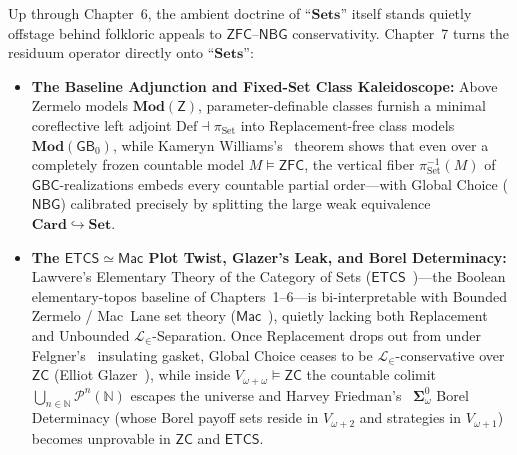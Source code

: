\documentclass[10pt,twoside,openright]{book}
\theoremstyle{crmplain}
\theoremstyle{crmdef}
\theoremstyle{crmremark}
\begin{document}
Up through Chapter~6, the ambient doctrine of ``$\mathbf{Sets}$'' itself stands quietly offstage behind folkloric appeals to $\mathsf{ZFC}$--$\mathsf{NBG}$ conservativity. Chapter~7 turns the residuum operator directly onto ``$\mathbf{Sets}$'':
\begin{itemize}
  \item \textbf{The Baseline Adjunction and Fixed-Set Class Kaleidoscope:} Above Zermelo models $\mathbf{Mod}(\mathsf{Z})$, parameter-definable classes furnish a minimal coreflective left adjoint $\mathrm{Def} \dashv \pi_{\mathrm{Set}}$ into Replacement-free class models $\mathbf{Mod}(\mathsf{GB}_0)$, while Kameryn Williams's~\cite{Williams18} theorem shows that even over a completely frozen countable model $M \models \mathsf{ZFC}$, the vertical fiber $\pi_{\mathrm{Set}}^{-1}(M)$ of $\mathsf{GBC}$-realizations embeds every countable partial order---with Global Choice ($\mathsf{NBG}$) calibrated precisely by splitting the large weak equivalence $\mathbf{Card} \hookrightarrow \mathbf{Set}$.
  \item \textbf{The $\mathsf{ETCS} \simeq \mathsf{Mac}$ Plot Twist, Glazer's Leak, and Borel Determinacy:} Lawvere's Elementary Theory of the Category of Sets ($\mathsf{ETCS}$~\cite{Lawvere64})---the Boolean elementary-topos baseline of Chapters~1--6---is bi-interpretable with Bounded Zermelo / Mac~Lane set theory ($\mathsf{Mac}$~\cite{Cole73,Mitchell72,Osius74,Mathias01}), quietly lacking both Replacement and Unbounded $\mathcal{L}_\in$-Separation. Once Replacement drops out from under Felgner's~\cite{Felgner71} insulating gasket, Global Choice ceases to be $\mathcal{L}_\in$-conservative over $\mathsf{ZC}$ (Elliot Glazer~\cite{Glazer23}), while inside $V_{\omega+\omega} \models \mathsf{ZC}$ the countable colimit $\bigcup_{n \in \mathbb{N}} \mathcal{P}^n(\mathbb{N})$ escapes the universe and Harvey Friedman's~\cite{Friedman71} $\boldsymbol{\Sigma}^0_\omega$ Borel Determinacy (whose Borel payoff sets reside in $V_{\omega+2}$ and strategies in $V_{\omega+1}$) becomes unprovable in $\mathsf{ZC}$ and $\mathsf{ETCS}$.

\end{itemize}
\end{document}
